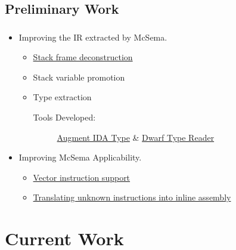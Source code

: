 \documentclass[mathserif,12pt,unknownkeysallowed]{beamer}
\newcommand{\cmt}[1]{}
\begin{document}
\subsection*{Preliminary Work}
\frame
{
  \frametitle{\subsecname}
      \begin{itemize}
        \item Improving the IR extracted by McSema.
          \begin{itemize}
            \item \href{https://github.com/sdasgup3/binary-decompilation/tree/stack_variable_recovery/tools/allin}{Stack frame deconstruction}
            \item Stack variable promotion
            \item Type extraction
            \begin{description}
              \item [Tools Developed: ] \href{https://github.com/sdasgup3/binary-decompilation/tree/stack_variable_recovery/tools/augment_ida_type}{Augment IDA Type} \& \href{https://github.com/sdasgup3/dwarf-type-reader}{Dwarf Type Reader}
            \end{description}
          \end{itemize}
      \end{itemize}

      \begin{itemize}
        \item Improving McSema Applicability.
          \begin{itemize}
            \item \href{https://github.com/trailofbits/mcsema/commit/ff83ee93840d3ab48f6abaf1a64908bbb0c63163}{Vector instruction support}
            \item \href{https://github.com/trailofbits/mcsema/commit/2ec9ee2342bc0721b73281f6aa758012f6afa035}{Translating unknown instructions into inline assembly}
          \end{itemize}
      \end{itemize}
}

\cmt{
 we use a set of instructions whose semantics are known to synthesize the semantics of additional instructions whose semantics are unknown. As the set of formally described instructions increases, the synthesis vocabulary expands, making it possible to synthesize the semantics of increasingly complex instructions.
}

\section*{Current Work}
\end{document}
